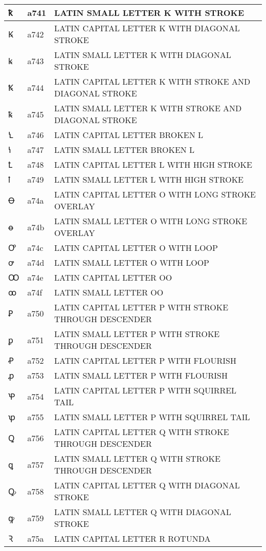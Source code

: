 \documentclass[12pt,letterpaper,openany]{book}
\begin{document}
\begin{center}
\begin{supertabular}{|m{0.25in}|m{0.5in}|m{4in}|}
			ꝁ & a741 & LATIN SMALL LETTER K WITH STROKE\\\hline
			Ꝃ & a742 & LATIN CAPITAL LETTER K WITH DIAGONAL STROKE\\\hline
			ꝃ & a743 & LATIN SMALL LETTER K WITH DIAGONAL STROKE\\\hline
			Ꝅ & a744 & LATIN CAPITAL LETTER K WITH STROKE AND DIAGONAL STROKE\\\hline
			ꝅ & a745 & LATIN SMALL LETTER K WITH STROKE AND DIAGONAL STROKE\\\hline
			Ꝇ & a746 & LATIN CAPITAL LETTER BROKEN L\\\hline
			ꝇ & a747 & LATIN SMALL LETTER BROKEN L\\\hline
			Ꝉ & a748 & LATIN CAPITAL LETTER L WITH HIGH STROKE\\\hline
			ꝉ & a749 & LATIN SMALL LETTER L WITH HIGH STROKE\\\hline
			Ꝋ & a74a & LATIN CAPITAL LETTER O WITH LONG STROKE OVERLAY\\\hline
			ꝋ & a74b & LATIN SMALL LETTER O WITH LONG STROKE OVERLAY\\\hline
			Ꝍ & a74c & LATIN CAPITAL LETTER O WITH LOOP\\\hline
			ꝍ & a74d & LATIN SMALL LETTER O WITH LOOP\\\hline
			Ꝏ & a74e & LATIN CAPITAL LETTER OO\\\hline
			ꝏ & a74f & LATIN SMALL LETTER OO\\\hline
			Ꝑ & a750 & LATIN CAPITAL LETTER P WITH STROKE THROUGH DESCENDER\\\hline
			ꝑ & a751 & LATIN SMALL LETTER P WITH STROKE THROUGH DESCENDER\\\hline
			Ꝓ & a752 & LATIN CAPITAL LETTER P WITH FLOURISH\\\hline
			ꝓ & a753 & LATIN SMALL LETTER P WITH FLOURISH\\\hline
			Ꝕ & a754 & LATIN CAPITAL LETTER P WITH SQUIRREL TAIL\\\hline
			ꝕ & a755 & LATIN SMALL LETTER P WITH SQUIRREL TAIL\\\hline
			Ꝗ & a756 & LATIN CAPITAL LETTER Q WITH STROKE THROUGH DESCENDER\\\hline
			ꝗ & a757 & LATIN SMALL LETTER Q WITH STROKE THROUGH DESCENDER\\\hline
			Ꝙ & a758 & LATIN CAPITAL LETTER Q WITH DIAGONAL STROKE\\\hline
			ꝙ & a759 & LATIN SMALL LETTER Q WITH DIAGONAL STROKE\\\hline
			Ꝛ & a75a & LATIN CAPITAL LETTER R ROTUNDA\\\hline

\end{supertabular}
\end{center}
\end{document}

